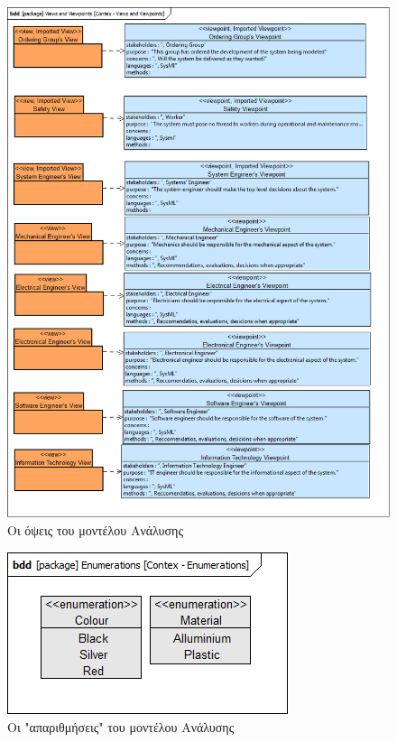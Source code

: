 \documentclass[a4paper,12pt,twoside]{report}
\begin{document}
\begin{appendices}
				\begin{figure}[hp]
					\centering
					\includegraphics[scale=0.30]{AnalysisModel_Contex-ViewsandViewpoints.png}
					\caption{Οι όψεις του μοντέλου Ανάλυσης}
					\label{φωτ:Οι όψεις του μοντέλου Ανάλυσης}
				\end{figure}
				
				\begin{figure}[hp]
					\centering
					\includegraphics[scale=0.50]{AnalysisModel_Contex-Enumerations.png}
					\caption{Οι "απαριθμήσεις" του μοντέλου Ανάλυσης}
					\label{φωτ:Οι "απαριθμήσεις" του μοντέλου Ανάλυσης}
				\end{figure}		


\end{appendices}
\end{document}

